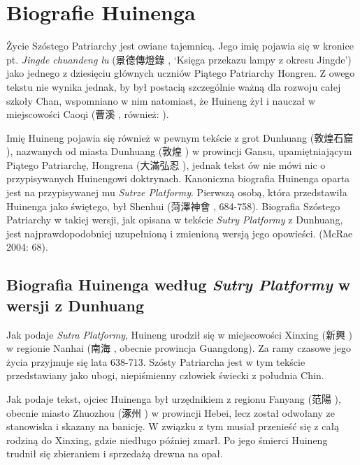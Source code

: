 \chapter{Biografie Huinenga}
Życie Szóstego Patriarchy jest owiane tajemnicą. Jego imię pojawia się w kronice pt. \textit{Jingde chuandeng lu} (景德傳燈錄 , `Księga przekazu lampy z okresu Jingde') jako jednego z dziesięciu głównych uczniów Piątego Patriarchy Hongren. Z owego tekstu nie wynika jednak, by był postacią szczególnie ważną dla rozwoju całej szkoły Chan, wspomniano w nim natomiast, że Huineng żył i nauczał w miejscowości Caoqi (曹溪 , również: ).

Imię Huineng pojawia się również w pewnym tekście z grot Dunhuang (敦煌石窟 ), nazwanych od miasta Dunhuang (敦煌 ) w prowincji Gansu, upamiętniającym Piątego Patriarchę, Hongrena (大滿弘忍 ), jednak tekst ów nie mówi nic o przypisywanych Huinengowi doktrynach. Kanoniczna biografia Huinenga oparta jest na przypisywanej mu \textit{Sutrze Platformy}. Pierwszą osobą, która przedstawiła Huinenga jako świętego, był Shenhui (菏澤神會 , 684-758). Biografia Szóstego Patriarchy w takiej wersji, jak opisana w tekście \textit{Sutry Platformy} z Dunhuang, jest najprawdopodobniej uzupełnioną i zmienioną wersją jego opowieści. (McRae 2004: 68).

\section{Biografia Huinenga według \textit{Sutry Platformy} w wersji z Dunhuang}
Jak podaje \textit{Sutra Platformy}, Huineng urodził się w miejscowości Xinxing (新興 ) w regionie Nanhai (南海 , obecnie prowincja Guangdong). Za ramy czasowe jego życia przyjmuje się lata 638-713. Szósty Patriarcha jest w tym tekście przedstawiany jako ubogi, niepiśmienny człowiek świecki z południa Chin.

Jak podaje tekst, ojciec Huinenga był urzędnikiem z regionu Fanyang (范陽 ), obecnie miasto Zhuozhou (涿州 ) w prowincji Hebei, lecz został odwołany ze stanowiska i skazany na banicję. W związku z tym musiał przenieść się z całą rodziną do Xinxing, gdzie niedługo później zmarł. Po jego śmierci Huineng trudnił się zbieraniem i sprzedażą drewna na opał.

